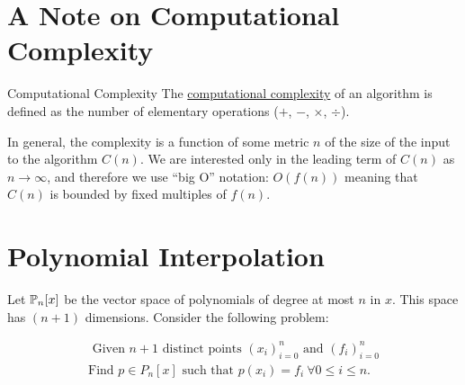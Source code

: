 \documentclass[../Main.tex]{subfiles}
\begin{document}
\section{A Note on Computational Complexity}
\begin{definition}{Computational Complexity}
    The \underline{computational complexity} of an algorithm is defined as the number of elementary operations ($+$, $-$, $\times$, $\div$).
\end{definition}
In general, the complexity is a function of some metric $n$ of the size of the input to the algorithm $C(n)$. We are interested only in the leading term of $C(n)$ as $n \to \infty$, and therefore we use ``big O'' notation: $O(f(n))$ meaning that $C(n)$ is bounded by fixed multiples of $f(n)$.
\section{Polynomial Interpolation}
Let $\P_n[x]$ be the vector space of polynomials of degree at most $n$ in $x$. This space has $(n+1)$ dimensions. Consider the following problem:

\begin{equation}
    \begin{split}
        \text{ Given $n+1$ distinct points } (x_i)_{i=0}^n \text{ and } (f_i)_{i=0}^n \\
        \text{Find } p \in P_n[x] \text{ such that } p(x_i) = f_i~\forall 0 \leq i \leq n.
    \end{split}
    \label{eqnInterpProblem}
\end{equation}
\end{document}
